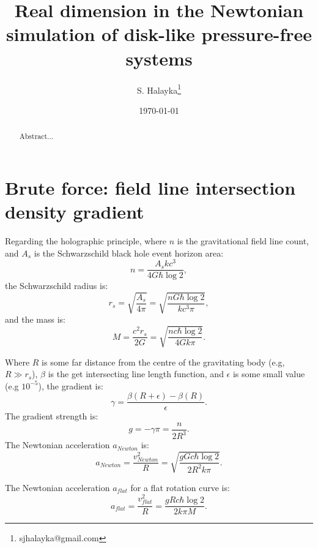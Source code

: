 \documentclass[12pt]{article}
\title{Real dimension in the Newtonian simulation of disk-like pressure-free systems}
\author{S. Halayka\footnote{sjhalayka@gmail.com}}
\date{\today\;\currenttime}
\begin{document}
 
\maketitle

\begin{abstract}
Abstract...
\end{abstract}






\section{Brute force: field line intersection density gradient}
Regarding the holographic principle, where $n$ is the gravitational field line count, and $A_s$ is the Schwarzschild black hole event horizon area:
\begin{equation}
n = \frac{A_s k c^3}{ 4 G \hbar \log 2},
\end{equation}
the Schwarzschild radius is:
\begin{equation}
r_s = \sqrt{\frac{A_s}{4 \pi}} = \sqrt{\frac{n G \hbar \log 2}{k c^3 \pi}},
\end{equation}
and the mass is:
\begin{equation}
M = \frac{c^2 r_s}{2 G} = \sqrt{\frac{n c \hbar \log 2}{4 G k \pi}}. 
\end{equation}

Where $R$ is some far distance from the centre of the gravitating body (e.g, $R \gg r_s$), $\beta$ is the get intersecting line length function, and $\epsilon$ is some small value (e.g $10^{-5}$), the gradient is:
\begin{equation}
\gamma = \frac{\beta(R + \epsilon) - \beta(R)}{\epsilon}.
\end{equation}
The gradient strength is:
\begin{equation}
g = -\gamma \pi = \frac{n}{2 R^3}.
\end{equation}
The Newtonian acceleration $a_{\textit{Newton}}$ is:
\begin{equation}
a_{\textit{Newton}} = \frac{v_{\textit{Newton}}^2}{R} = \sqrt{\frac{g G c \hbar \log 2}{2 R^2 k \pi}}.
\end{equation}

The Newtonian acceleration $a_{\textit{flat}}$ for a flat rotation curve is:
\begin{equation}
a_{\textit{flat}} = \frac{v_{\textit{flat}}^2}{R} = \frac{g R c \hbar \log 2}{2 k \pi M}.
\end{equation}
\end{document}
